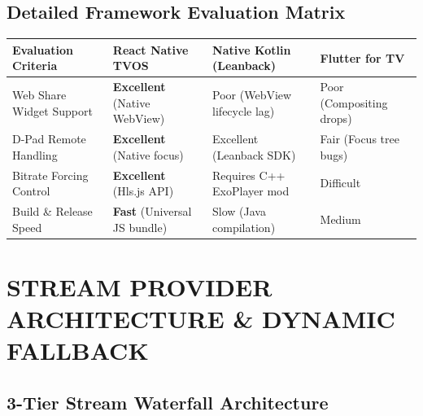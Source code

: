 \documentclass[12pt, a4paper, oneside, openany]{report}
\begin{document}
\section{Detailed Framework Evaluation Matrix}

\begin{longtable}{|L{1.3in}|L{1.6in}|L{1.6in}|L{1.4in}|}
  \hline
  \textbf{Evaluation Criteria} & \textbf{React Native TVOS} & \textbf{Native Kotlin (Leanback)} & \textbf{Flutter for TV} \\ \hline
  \endhead
  \hline
  \endfoot
  Web Share Widget Support & \textbf{Excellent} (Native WebView) & Poor (WebView lifecycle lag) & Poor (Compositing drops) \\ \hline
  D-Pad Remote Handling & \textbf{Excellent} (Native focus) & Excellent (Leanback SDK) & Fair (Focus tree bugs) \\ \hline
  Bitrate Forcing Control & \textbf{Excellent} (Hls.js API) & Requires C++ ExoPlayer mod & Difficult \\ \hline
  Build \& Release Speed & \textbf{Fast} (Universal JS bundle) & Slow (Java compilation) & Medium \\ \hline
\end{longtable}

\chapter{STREAM PROVIDER ARCHITECTURE \& DYNAMIC FALLBACK}

\section{3-Tier Stream Waterfall Architecture}
\end{document}
